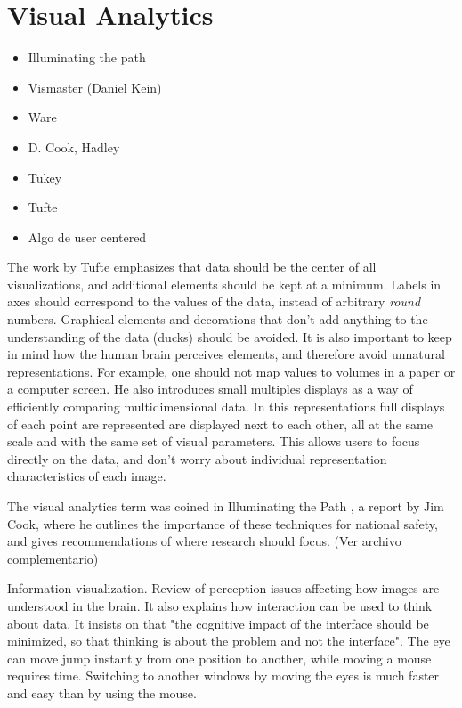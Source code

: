 
\section{Visual Analytics}
\begin{itemize}
	\item Illuminating the path
	\item Vismaster (Daniel Kein)	
	\item Ware
	\item D. Cook, Hadley
	\item Tukey
	\item Tufte	
	\item Algo de user centered
\end{itemize}	

The work by Tufte \autocite{tufte_visual_1983} emphasizes that data should be the center of all visualizations, and additional elements should be kept at a minimum. Labels in axes should correspond to the values of the data, instead of arbitrary \emph{round} numbers. Graphical elements and decorations that don't add anything to the understanding of the data (ducks) should be avoided. It is also important to keep in mind how the human brain perceives elements, and therefore avoid unnatural representations. For example, one should not map values to volumes in a paper or a computer screen. He also introduces small multiples displays as a way of efficiently comparing multidimensional data. In this representations full displays of each point are represented are displayed next to each other, all at the same scale and with the same set of visual parameters. This allows users to focus directly on the data, and don't worry about individual representation characteristics of each image.

The visual analytics term was coined in Illuminating the Path \autocite{cook_illuminating_2005}, a report by Jim Cook, where he outlines the importance of these techniques for national safety, and gives recommendations of 	where research should focus. (Ver archivo complementario)
	
\autocite{ware_information_2004} Information visualization. Review of perception issues affecting how images are understood in the brain. It also explains how interaction can be used to think about data. It insists on that "the cognitive impact of the interface should be minimized, so that thinking is about the problem and not the interface". The eye can move jump instantly from one position to another, while moving a mouse requires time. Switching to another windows by moving the eyes is much faster and easy than by using the mouse.
	
